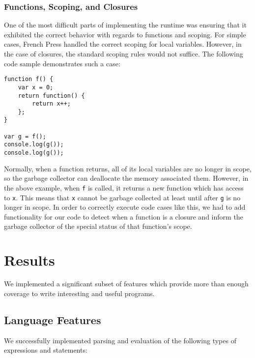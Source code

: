 \documentclass{article}
\begin{document}
\begin{multicols}{2}
\subsubsection*{Functions, Scoping, and Closures}

One of the most difficult parts of implementing the runtime was ensuring that it
exhibited the correct behavior with regards to functions and scoping. For simple
cases, French Press handled the correct scoping for local variables. However,
in the case of closures, the standard scoping rules would not suffice. The
following code sample demonstrates such a case:

\vspace{3mm}

\begin{lstlisting}
function f() {
    var x = 0;
    return function() {
        return x++;
    };
}

var g = f();
console.log(g());
console.log(g());

\end{lstlisting}

\vspace{3mm}

Normally, when a function returns, all of its local variables are no longer in
scope, so the garbage collector can deallocate the memory associated them.
However, in the above example, when \texttt{f} is called, it returns a new
function which has access to \texttt{x}. This means that \texttt{x} cannot
be garbage collected at least until after \texttt{g} is no longer in scope.
In order to correctly execute code cases like this, we had to add functionality
for our code to detect when a function is a closure and inform the garbage
collector of the special status of that function's scope.

\section{Results}

We implemented a significant subset of features which provide more than enough
coverage to write interesting and useful programs.

\subsection{Language Features}

We successfully implemented parsing and evaluation of the following types of
expressions and statements:


\end{multicols}
\end{document}
